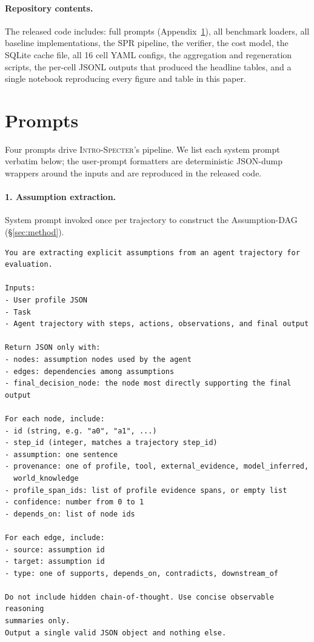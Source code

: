 \documentclass{article}
\newcommand{\method}{\textsc{Intro-Specter}\xspace}
\begin{document}
\paragraph{Repository contents.} The released code includes: full prompts (Appendix~\ref{app:prompts}), all benchmark loaders, all baseline implementations, the SPR pipeline, the verifier, the cost model, the SQLite cache file, all 16 cell YAML configs, the aggregation and regeneration scripts, the per-cell JSONL outputs that produced the headline tables, and a single notebook reproducing every figure and table in this paper.

\section{Prompts}\label{app:prompts}

Four prompts drive \method's pipeline. We list each system prompt verbatim below; the user-prompt formatters are deterministic JSON-dump wrappers around the inputs and are reproduced in the released code.

\paragraph{1. Assumption extraction.} System prompt invoked once per trajectory to construct the Assumption-DAG (\S\ref{sec:method}).

{\small\begin{verbatim}
You are extracting explicit assumptions from an agent trajectory for evaluation.

Inputs:
- User profile JSON
- Task
- Agent trajectory with steps, actions, observations, and final output

Return JSON only with:
- nodes: assumption nodes used by the agent
- edges: dependencies among assumptions
- final_decision_node: the node most directly supporting the final output

For each node, include:
- id (string, e.g. "a0", "a1", ...)
- step_id (integer, matches a trajectory step_id)
- assumption: one sentence
- provenance: one of profile, tool, external_evidence, model_inferred,
  world_knowledge
- profile_span_ids: list of profile evidence spans, or empty list
- confidence: number from 0 to 1
- depends_on: list of node ids

For each edge, include:
- source: assumption id
- target: assumption id
- type: one of supports, depends_on, contradicts, downstream_of

Do not include hidden chain-of-thought. Use concise observable reasoning
summaries only.
Output a single valid JSON object and nothing else.
\end{verbatim}}
\end{document}
